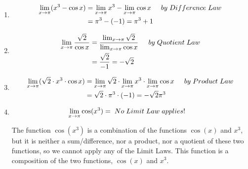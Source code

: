 \documentclass{ximera}
\begin{document}
\begin{example}
\begin{enumerate}
\item 
\begin{align*}
\lim_{x\to \pi} (x^3-\cos{x})&=\lim_{x\to \pi} x^3-\lim_{x\to \pi}\cos{x} \hspace{0.2in}by \hspace{0.04in}Difference\hspace{0.04in} Law\\
& =\pi^3-(-1)=\pi^3+1
\end{align*}
\item 
\begin{align*}
\lim_{x\to \pi} \frac{\sqrt{2}}{\cos{x}}&=\frac{\lim_{x\to \pi}\sqrt{2}}{\lim_{x\to \pi}\cos{x}}\hspace{0.2in}by \hspace{0.04in}Quotient\hspace{0.04in} Law\\
& =\frac{\sqrt{2}}{-1}=-\sqrt{2}
\end{align*}
\item 
\begin{align*}
\lim_{x\to \pi} (\sqrt{2}\cdot x^3\cdot\cos{x})&=\lim_{x\to \pi} \sqrt{2}\cdot \lim_{x\to \pi}x^3\cdot \lim_{x\to \pi}\cos{x} \hspace{0.2in}by \hspace{0.04in}Product\hspace{0.04in} Law\\
& =\sqrt{2}\cdot \pi^3\cdot(-1)=-\sqrt{2}\pi^3
\end{align*}
\item 
\begin{align*}
\lim_{x\to \pi} \cos({x^3})&= \hspace{0.04in}No\hspace{0.04in}Limit \hspace{0.04in} Law\hspace{0.04in}applies!
\end{align*}
\begin{explanation}
The function $\cos({x^3})$ is a combination of the functions $\cos({x})$ and $x^3$, but it is neither a sum/difference, nor a product, nor a quotient of these two functions, so we cannot apply any of the Limit Laws. This function is a composition of the two functions,  $\cos({x})$ and $x^3$.
\end{explanation}
\end{enumerate}
\end{example}
\end{document}
